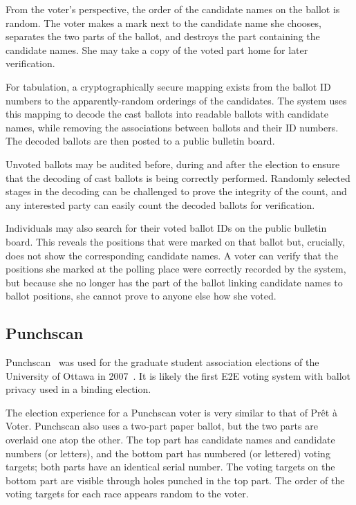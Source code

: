 From the voter's perspective, the order of the candidate names on the
ballot is random. The voter makes a mark next to the candidate name
she chooses, separates the two parts of the ballot, and destroys the
part containing the candidate names. She may take a copy of the voted
part home for later verification.

For tabulation, a cryptographically secure mapping exists from the
ballot ID numbers to the apparently-random orderings of the
candidates. The system uses this mapping to decode the cast ballots
into readable ballots with candidate names, while removing the
associations between ballots and their ID numbers. The decoded ballots
are then posted to a public bulletin board.

Unvoted ballots may be audited before, during and after the election
to ensure that the decoding of cast ballots is being correctly
performed. Randomly selected stages in the decoding can be challenged
to prove the integrity of the count, and any interested party can
easily count the decoded ballots for verification.

Individuals may also search for their voted ballot IDs on the public
bulletin board. This reveals the positions that were marked on that
ballot but, crucially, does not show the corresponding candidate
names. A voter can verify that the positions she marked at the polling
place were correctly recorded by the system, but because she no longer
has the part of the ballot linking candidate names to ballot
positions, she cannot prove to anyone else how she voted.


\subsection{Punchscan}
\label{sec:punchscan}

Punchscan~\cite{popoveniuc2006,popoveniuc2010punchscan} was used for
the graduate student association elections of the University of Ottawa
in 2007~\cite{essex2007}. It is likely the first E2E voting system
with ballot privacy used in a binding election.

The election experience for a Punchscan voter is very similar to that
of Prêt à Voter. Punchscan also uses a two-part paper ballot, but the
two parts are overlaid one atop the other. The top part has candidate
names and candidate numbers (or letters), and the bottom part has
numbered (or lettered) voting targets; both parts have an identical
serial number. The voting targets on the bottom part are visible
through holes punched in the top part. The order of the voting targets
for each race appears random to the voter.

